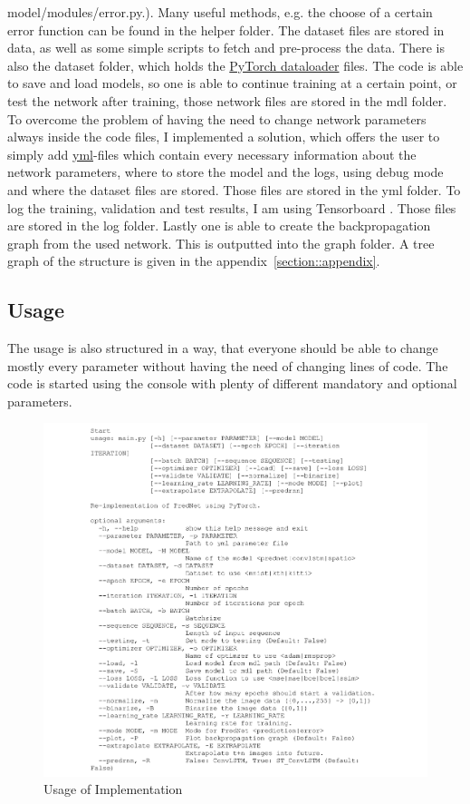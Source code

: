   model/modules/error.py.). Many useful methods, e.g. the choose of a certain error function can be found in the helper folder. The dataset files are stored in 
  data, as well as some simple scripts to fetch and pre-process the data. There is also the dataset folder, which holds the \href{https://pytorch.org/docs/stable/
  data.html}{PyTorch dataloader} files. The code is able to save and load models, so one is able to continue training at a certain point, or test the network
  after training, those network files are stored in the mdl folder. To overcome the problem of having the need to change network parameters always inside the
  code files, I implemented a solution, which offers the user to simply add \href{https://yaml.org/}{yml}-files which contain every necessary information about 
  the network parameters, where to store the model and the logs, using debug mode and where the dataset files are stored. Those files are stored in the yml 
  folder. To log the training, validation and test results, I am using Tensorboard \cite{tensorflow2015}. Those files are stored in the log folder.
  Lastly one is able to create the backpropagation graph from the used network. This is outputted into the graph folder.
  A tree graph of the structure is given in the appendix~\ref{section::appendix}.
  
 \subsection{Usage}
  The usage is also structured in a way, that everyone should be able to change mostly every parameter without having the need of changing lines of code.
  The code is started using the console with plenty of different mandatory and optional parameters.
  \begin{figure}[H]
   \includegraphics[width=1.0\textwidth]{../Images/usage.png}
   \centering
   \caption{Usage of Implementation}
   \label{fig:tree}
  \end{figure}\noindent
